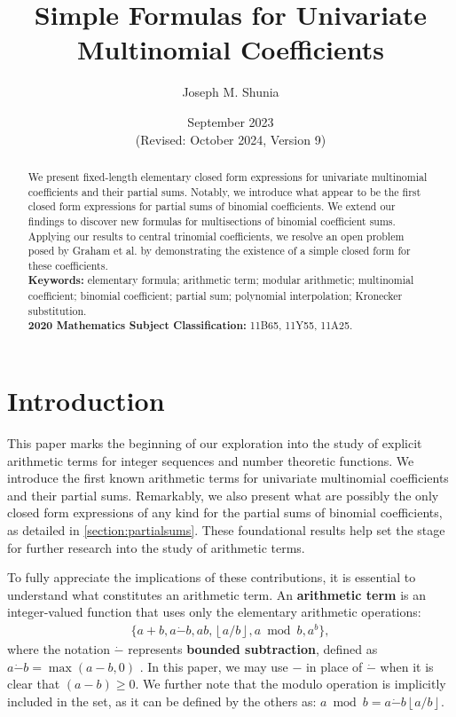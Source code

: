 \documentclass[10pt]{article}
\title{Simple Formulas for Univariate Multinomial Coefficients}
\author{Joseph M. Shunia}
\date{September 2023 \\ \small (Revised: October 2024, Version 9) \normalsize}
\theoremstyle{plain}
\newcommand{\floor}[1]{\left\lfloor #1 \right\rfloor}
\begin{document}
\maketitle

 \begin{abstract}
 \noindent
We present fixed-length elementary closed form expressions for univariate multinomial coefficients and their partial sums. Notably, we introduce what appear to be the first closed form expressions for partial sums of binomial coefficients. We extend our findings to discover new formulas for multisections of binomial coefficient sums. Applying our results to central trinomial coefficients, we resolve an open problem posed by Graham et al. by demonstrating the existence of a simple closed form for these coefficients.
 \\[2mm]
 {\bf Keywords:} elementary formula; arithmetic term; modular arithmetic; multinomial coefficient; binomial coefficient; partial sum; polynomial interpolation; Kronecker substitution.\\[2mm]
 {\bf 2020 Mathematics Subject Classification:} 11B65, 11Y55, 11A25.
 \end{abstract}

\section{Introduction}
This paper marks the beginning of our exploration into the study of explicit arithmetic terms for integer sequences and number theoretic functions. We introduce the first known arithmetic terms for univariate multinomial coefficients and their partial sums. Remarkably, we also present what are possibly the only closed form expressions of any kind for the partial sums of binomial coefficients, as detailed in \cref{section:partialsums}. These foundational results help set the stage for further research into the study of arithmetic terms.

To fully appreciate the implications of these contributions, it is essential to understand what constitutes an arithmetic term. An \textbf{arithmetic term} is an integer-valued function that uses only the elementary arithmetic operations:
\begin{align*}
    \{ a + b, a \dot{-} b, ab, \floor{a/b}, a \bmod b, a^b \} ,
\end{align*}
where the notation $\dot{-}$ represents \textbf{bounded subtraction}, defined as $a \dot{-} b = \max(a-b,0)$ \cite{mazzanti2002plainbases, prunescu2024representation}. In this paper, we may use $-$ in place of $\dot{-}$ when it is clear that $(a-b) \geq 0$. We further note that the modulo operation is implicitly included in the set, as it can be defined by the others as: $a \bmod b = a \dot{-} b \floor{a/b}$. 
\end{document}
